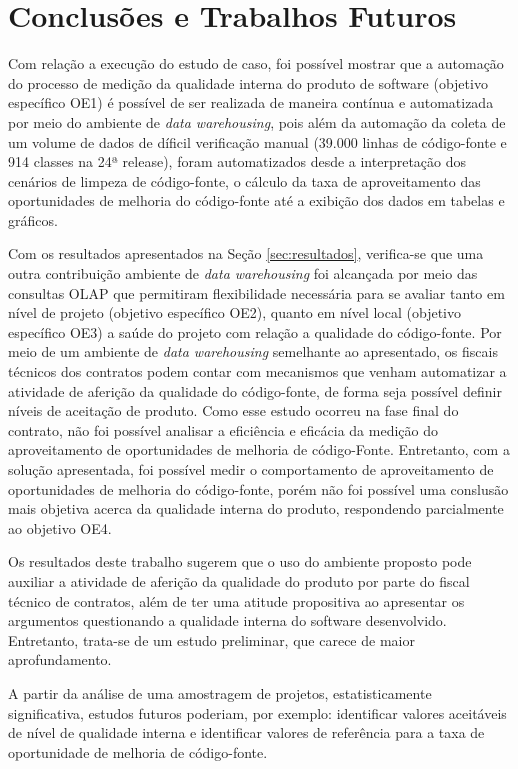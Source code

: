 \section{Conclusões e Trabalhos Futuros}


Com relação a execução do estudo de caso, foi possível mostrar que a automação do processo de medição da qualidade interna do produto de software (objetivo específico OE1)  é possível de ser realizada de maneira contínua e automatizada por meio do ambiente de \textit{data warehousing}, pois além da automação da coleta de um volume de dados de díficil verificação manual (39.000 linhas de código-fonte e 914 classes na 24ª release), foram automatizados desde a interpretação dos cenários de limpeza de código-fonte, o cálculo da taxa de aproveitamento das oportunidades de melhoria do código-fonte até a exibição dos dados em tabelas e gráficos.

Com os resultados apresentados na Seção \ref{sec:resultados}, verifica-se que uma outra contribuição ambiente de \textit{data warehousing} foi alcançada por meio das consultas OLAP que permitiram flexibilidade necessária para se avaliar tanto em nível de projeto (objetivo específico OE2), quanto em nível local (objetivo específico OE3) a saúde do projeto com relação a qualidade do código-fonte. Por meio de um ambiente de \textit{data warehousing} semelhante ao apresentado, os fiscais técnicos dos contratos podem contar com mecanismos que venham automatizar a atividade de aferição da qualidade do código-fonte, de forma seja possível definir níveis de aceitação de produto.
Como esse estudo ocorreu na fase final do contrato, não foi possível analisar a eficiência e eficácia da medição do aproveitamento de oportunidades de melhoria de código-Fonte. Entretanto, com a solução apresentada, foi possível medir o comportamento de aproveitamento de oportunidades de melhoria do código-fonte, porém não foi possível uma conslusão mais objetiva acerca da qualidade interna do produto, respondendo parcialmente ao objetivo OE4.

Os resultados deste trabalho sugerem que o uso do ambiente proposto pode auxiliar a atividade de aferição da qualidade do produto por parte do fiscal técnico de contratos, além de ter uma atitude propositiva ao apresentar os argumentos questionando a qualidade interna do software desenvolvido. Entretanto, trata-se de um estudo preliminar, que carece de maior aprofundamento. 

A partir da análise de uma amostragem de projetos, estatisticamente significativa, estudos futuros poderiam, por exemplo: identificar valores aceitáveis de nível de qualidade interna e identificar valores de referência para a taxa de oportunidade de melhoria de código-fonte.